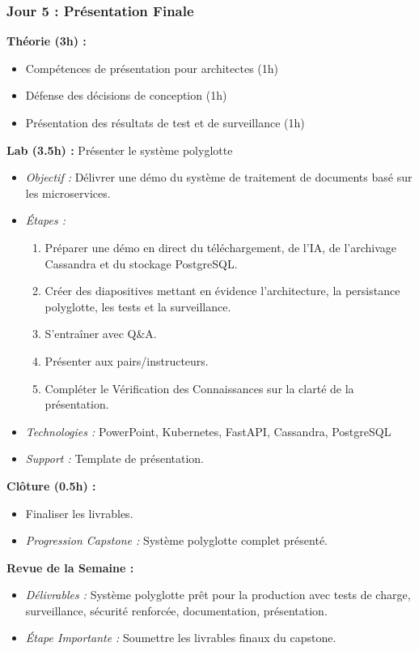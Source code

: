 \documentclass[11pt]{article}
\begin{document}
\subsubsection{Jour 5 : Présentation Finale}
\textbf{Théorie (3h) :}
\begin{itemize}
    \item Compétences de présentation pour architectes (1h)
    \item Défense des décisions de conception (1h)
    \item Présentation des résultats de test et de surveillance (1h)
\end{itemize}
\textbf{Lab (3.5h) :} Présenter le système polyglotte
\begin{itemize}
    \item \textit{Objectif :} Délivrer une démo du système de traitement de documents basé sur les microservices.
    \item \textit{Étapes :}
        \begin{enumerate}
            \item Préparer une démo en direct du téléchargement, de l'IA, de l'archivage Cassandra et du stockage PostgreSQL.
            \item Créer des diapositives mettant en évidence l'architecture, la persistance polyglotte, les tests et la surveillance.
            \item S'entraîner avec Q\&A.
            \item Présenter aux pairs/instructeurs.
            \item Compléter le Vérification des Connaissances sur la clarté de la présentation.
        \end{enumerate}
    \item \textit{Technologies :} PowerPoint, Kubernetes, FastAPI, Cassandra, PostgreSQL
    \item \textit{Support :} Template de présentation.
\end{itemize}
\textbf{Clôture (0.5h) :}
\begin{itemize}
    \item Finaliser les livrables.
    \item \textit{Progression Capstone :} Système polyglotte complet présenté.
\end{itemize}

\textbf{Revue de la Semaine :}
\begin{itemize}
    \item \textit{Délivrables :} Système polyglotte prêt pour la production avec tests de charge, surveillance, sécurité renforcée, documentation, présentation.
    \item \textit{Étape Importante :} Soumettre les livrables finaux du capstone.
\end{itemize}
\end{document}
